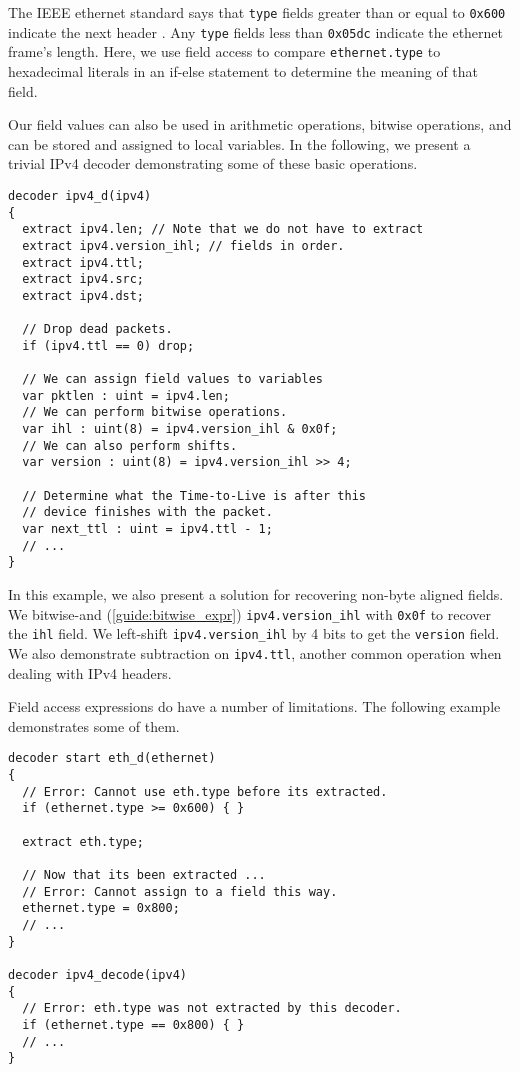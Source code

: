 The IEEE ethernet standard says that \texttt{type} fields greater than or equal to \texttt{0x600} indicate the next header \cite{eth_std}. Any \texttt{type} fields less than \texttt{0x05dc} indicate the ethernet frame's length. Here, we use field access to compare \texttt{ethernet.type} to hexadecimal literals in an if-else statement to determine the meaning of that field.

Our field values can also be used in arithmetic operations, bitwise operations, and can be stored and assigned to local variables. In the following, we present a trivial IPv4 decoder demonstrating some of these basic operations.

\begin{codepage}
\begin{lstlisting}
decoder ipv4_d(ipv4)
{
  extract ipv4.len; // Note that we do not have to extract
  extract ipv4.version_ihl; // fields in order.
  extract ipv4.ttl;
  extract ipv4.src;
  extract ipv4.dst;

  // Drop dead packets.
  if (ipv4.ttl == 0) drop;

  // We can assign field values to variables
  var pktlen : uint = ipv4.len;
  // We can perform bitwise operations.
  var ihl : uint(8) = ipv4.version_ihl & 0x0f;
  // We can also perform shifts.
  var version : uint(8) = ipv4.version_ihl >> 4;

  // Determine what the Time-to-Live is after this
  // device finishes with the packet.
  var next_ttl : uint = ipv4.ttl - 1;
  // ...
}
\end{lstlisting}
\end{codepage}

In this example, we also present a solution for recovering non-byte aligned fields. We bitwise-and (\ref{guide:bitwise_expr}) \texttt{ipv4.version\_ihl} with \texttt{0x0f} to recover the \texttt{ihl} field. We left-shift \texttt{ipv4.version\_ihl} by 4 bits to get the \texttt{version} field. We also demonstrate subtraction on \texttt{ipv4.ttl}, another common operation when dealing with IPv4 headers.

Field access expressions do have a number of limitations. The following example demonstrates some of them.

\begin{codepage}
\begin{lstlisting}
decoder start eth_d(ethernet)
{
  // Error: Cannot use eth.type before its extracted.
  if (ethernet.type >= 0x600) { }

  extract eth.type;

  // Now that its been extracted ...
  // Error: Cannot assign to a field this way.
  ethernet.type = 0x800;
  // ...
}

decoder ipv4_decode(ipv4)
{
  // Error: eth.type was not extracted by this decoder.
  if (ethernet.type == 0x800) { }
  // ...
}
\end{lstlisting}
\end{codepage}

